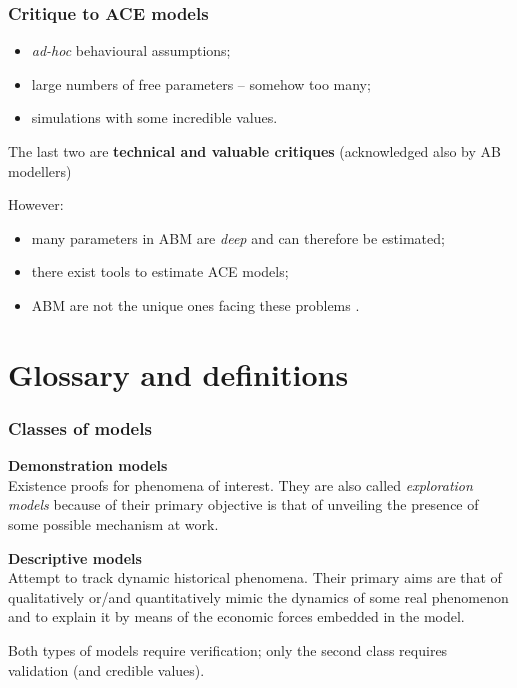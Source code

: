 \documentclass[10pt]{beamer}
\begin{document}


\begin{frame}[c]\frametitle{Critique to ACE models}
	\begin{itemize}
		\item \emph{ad-hoc} behavioural assumptions;
		\item large numbers of free parameters -- somehow too many;
		\item simulations with some incredible values.
	\end{itemize} \bigskip
	
	The last two are \alert{\textbf{technical and valuable critiques}} (acknowledged also by AB modellers) \bigskip

	However:
	\begin{itemize}
		\item many parameters in ABM are \emph{deep} and can therefore be estimated; %
		\item there exist tools to estimate ACE models; %
		\item ABM are not the unique ones facing these problems \citep{fagiolo2017redux}. %
	\end{itemize} \bigskip

\end{frame}


\section{Glossary and definitions}


\begin{frame}[c]\frametitle{Classes of models}
	\alert{\textbf{Demonstration models}} 
	\\ Existence proofs for phenomena of interest. They are also called \emph{exploration models} because of their primary objective is that of unveiling the presence of some possible mechanism at work. \bigskip

	\alert{\textbf{Descriptive models}} 
	\\ Attempt to track dynamic historical phenomena. Their primary aims are that of qualitatively or/and quantitatively mimic the dynamics of some real phenomenon and to explain it by means of the economic forces embedded in the model.

	Both types of models require verification; only the second class requires validation (and credible values).
\end{frame}
\end{document}
